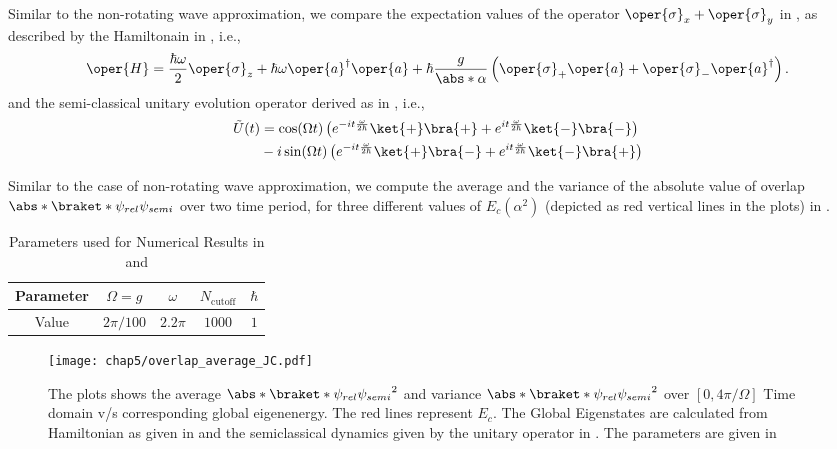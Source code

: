 Similar to the non-rotating wave approximation, we compare the expectation values of the operator
\(\oper{\sigma}_x + \oper{\sigma}_y\) in , as described by the Hamiltonain in , i.e., 
\begin{eqnarray}
\label{eq:chap5_JC_rotwave_hamiltonian}
    \oper{H} = \frac{\hbar \omega}{2} \oper{\sigma}_z + \hbar \omega\oper{a}^\dagger \oper{a}
    + \hbar \frac{g}{\abs*{\alpha}} \left(\oper{\sigma}_+ \oper{a} + \oper{\sigma}_- \oper{a}^\dagger\right).
\end{eqnarray}
and the semi-classical unitary evolution operator derived as in , i.e.,
\begin{eqnarray}
\label{eq:chap5_JC_rotwave_unitary_semi}
    \tilde{U}(t) 
    &= \cos(\Omega t) \left(e^{-i t \frac{\omega}{2\hbar}}\ket{+}\bra{+} + 
    e^{i t \frac{\omega}{2\hbar}}\ket{-}\bra{-} \right)  \nonumber \\
    &- i \sin(\Omega t)
     \left( e^{-i t \frac{\omega}{2\hbar}}\ket{+}\bra{-}
    + e^{i t \frac{\omega}{2\hbar}}\ket{-}\bra{+}\right) 
\end{eqnarray}




Similar to the case of non-rotating wave approximation, we compute the average and the 
variance of the absolute value of overlap \(\abs*{\braket*{\psi_{rel}}{\psi_{semi}}}\) over two time period, 
for three different values of \(E_c(\alpha^2)\) (depicted as red vertical lines in the plots)
in .

\begin{table}[!ht]
    \centering
        \begin{tabular}{|c|c|c|c|c|}
            \hline
            Parameter & $\Omega = g$ & $\omega$ & $N_{\text{cutoff}}$ & $\hbar$ \\
            \hline
            Value & $2\pi/100$ & $2.2\pi$ & $1000$ & $1$ \\
            \hline
        \end{tabular}
    \caption{Parameters used for Numerical Results in  and 
    }
    \label{tab:numerical_values_JC}
\end{table}

\begin{figure}[!h]
    \centering
    \texttt{[image: chap5/overlap\_average\_JC.pdf]}
    \caption{The plots shows the average $\abs*{\braket*{\psi_{rel}}{\psi_{semi}}}^2$ and 
     variance $\abs*{\braket*{\psi_{rel}}{\psi_{semi}}}^2$ over \([0, 4\pi/\Omega]\) Time domain v/s corresponding global eigenenergy. The red lines represent \(E_c\).
     The Global Eigenstates are calculated from 
    Hamiltonian as given in  and the semiclassical dynamics given by the unitary operator in . The parameters 
    are given in  }
     \label{fig:chap5_JCM_overlap_avg}
\end{figure}



